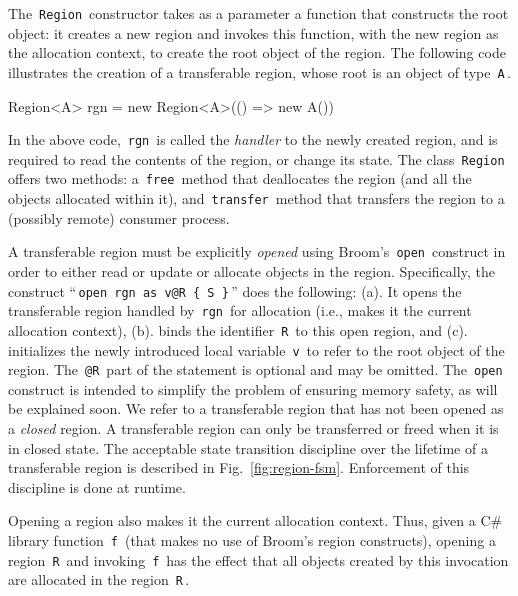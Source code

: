 \documentclass[a4paper,UKenglish]{lipics-v2018}
\newcommand{\C}[1]{\code{#1}}
\newcommand{\code}[1]{\,{\tt #1}\,}
\newcommand{\name}{{\sc Broom}\xspace}
\begin{document}
The \C{Region} constructor takes as a parameter a function that
constructs the root object: it creates a new region and invokes this
function, with the new region as the allocation context, to create the
root object of the region. The following code illustrates the
creation of a transferable region, whose root is an object of type
\C{A}.
\begin{codejava} 
  Region<A> rgn = new Region<A>(() => new A())
\end{codejava} 
In the above code, \C{rgn} is called the \emph{handler} to the newly
created region, and is required to read the contents of the region, or
change its state. The class \C{Region} offers two methods: a \C{free}
method that deallocates the region (and all the objects allocated
within it), and \C{transfer} method that transfers the region to a
(possibly remote) consumer process. 

 A transferable region must be
explicitly \emph{opened} using \name's \C{open} construct in order to
either read or update or allocate objects in the region.
Specifically, the construct ``\C{open rgn as v@R \{ S \}}'' does the
following: (a). It opens the transferable region handled by \C{rgn}
for allocation (i.e., makes it the current allocation context), (b).
binds the identifier \C{R} to this open region, and (c). initializes
the newly introduced local variable \C{v} to refer to the root object
of the region.  The \C{@R} part of the statement is optional and may
be omitted.  The \C{open} construct is intended to simplify the
problem of ensuring memory safety, as will be explained soon.  We
refer to a transferable region that has not been opened as a
\emph{closed} region. A transferable region can only be transferred or
freed when it is in closed state. The acceptable state transition
discipline over the lifetime of a transferable region is described
in Fig.~\ref{fig:region-fsm}. Enforcement of this discipline is done
at runtime.

Opening a region also makes it the current allocation context.
Thus, given a  C\# library function \C{f} (that makes no use of \name's region constructs),
opening a region \C{R} and invoking \C{f} has the effect that all objects created by this
invocation are allocated in the region \C{R}.
\end{document}
